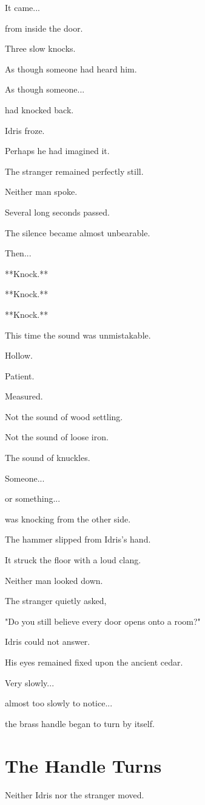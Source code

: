 \documentclass[12pt,openany]{book}
\begin{document}
It came...

from inside the door.

Three slow knocks.

As though someone had heard him.

As though someone...

had knocked back.

Idris froze.

Perhaps he had imagined it.

The stranger remained perfectly still.

Neither man spoke.

Several long seconds passed.

The silence became almost unbearable.

Then...

**Knock.**

**Knock.**

**Knock.**

This time the sound was unmistakable.

Hollow.

Patient.

Measured.

Not the sound of wood settling.

Not the sound of loose iron.

The sound of knuckles.

Someone...

or something...

was knocking from the other side.

The hammer slipped from Idris's hand.

It struck the floor with a loud clang.

Neither man looked down.

The stranger quietly asked,

"Do you still believe every door opens onto a room?"

Idris could not answer.

His eyes remained fixed upon the ancient cedar.

Very slowly...

almost too slowly to notice...

the brass handle began to turn by itself.
\section*{The Handle Turns}

Neither Idris nor the stranger moved.
\end{document}

